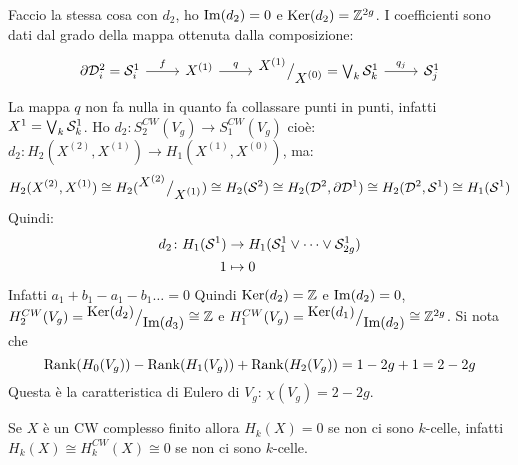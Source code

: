 Faccio la stessa cosa con $ d_2 $, ho $ \mathrm{Im}( d_2 ) = 0 $ e $ \mathrm{Ker}( d_2) = \mathbb{Z}^{2g} $.
I coefficienti sono dati dal grado della mappa ottenuta dalla composizione:
\[
  \begin{tikzcd}
    \partial \Disk{2}_i = \Sph{1}_i \rar{f} & X^{(1)} \rar{q} & \quot{X^{(1)}}{X^{(0)}} = \bigvee_k \Sph{1}_k \rar{q_j} & \Sph{1}_j
  \end{tikzcd}
\]
La mappa $ q $ non fa nulla in quanto fa collassare punti in punti, infatti
$ X^{1} = \bigvee_k \mathcal{S}^{1}_k $.
Ho $ d_2 \colon S^{CW}_2(V_g) \to S_1^{CW}(V_g) $ cioè:
$ d_2 \colon H_2(X^{(2)}, X^{(1)}) \to H_1(X^{(1)}, X^{(0)}) $,
ma:
\[
  H_2(X^{(2)}, X^{(1)}) \cong H_2({^{\textstyle X^{(2)}}\big/_{\textstyle X^{(1)}}}) \cong H_2(\mathcal{S}^{2}) \cong H_2(\mathcal{D}^{2}, \partial \mathcal{D}^{1})
  \cong H_2(\mathcal{D}^{2}, \mathcal{S}^{1}) \cong H_1(\mathcal{S}^{1})
\]
Quindi:
\begin{align*}
  d_2 \colon H_1(\mathcal{S}^{1}) & \to H_1(\mathcal{S}^{1}_1 \vee \dots \vee \mathcal{S}^{1}_{2g}) \\
  1 & \mapsto 0
\end{align*}
Infatti $ a_1 + b_1 - a_1 - b_1 \dots = 0$
Quindi $ \mathrm{Ker}( d_2) = \mathbb{Z} $ e $ \mathrm{Im}( d_2 ) = 0 $,
$ H_2^{CW}(V_g) = {^{\textstyle \mathrm{Ker}( d_2)}\big/_{\textstyle \mathrm{Im}( d_3 )}} \cong \mathbb{Z} $ e
$ H_1^{CW}(V_g) = {^{\textstyle \mathrm{Ker}( d_1)}\big/_{\textstyle \mathrm{Im}( d_2 )}} \cong \mathbb{Z}^{2g} $.
Si nota che
\[
  \mathrm{Rank}( H_0(V_g) ) - \mathrm{Rank}( H_1(V_g) ) + \mathrm{Rank}( H_2(V_g) ) = 1 - 2g + 1 = 2 - 2g
\]
Questa è la caratteristica di Eulero di $ V_g $: $ \chi(V_g) = 2 - 2g $.

\begin{osservation}
  Se $ X $ è un CW complesso finito allora $ H_k(X) = 0 $ se non ci sono $ k $-celle,
  infatti $ H_k(X) \cong H_k^{CW}(X) \cong 0 $ se non ci sono $ k $-celle.
\end{osservation}

